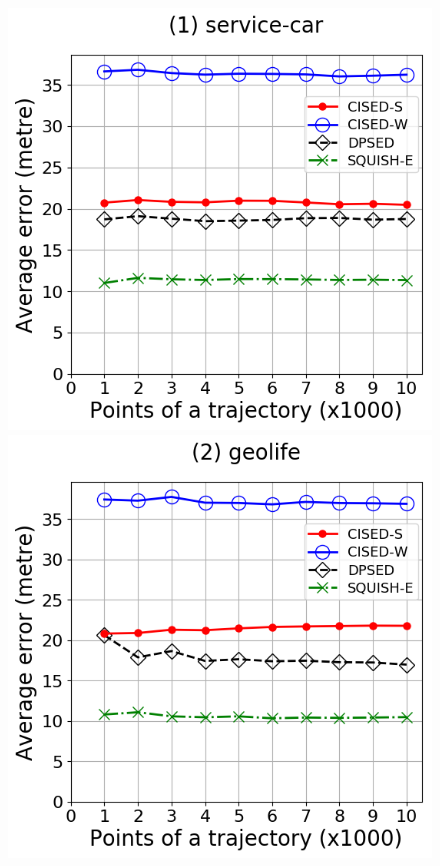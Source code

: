 \begin{figure}[tb!]
	\centering
	\includegraphics[scale = 0.2750]{Figures/Exp-error-size-service.png}\hspace{3ex}
	\includegraphics[scale = 0.2750]{Figures/Exp-error-size-geolife.png}\hspace{3ex}

\end{figure}

